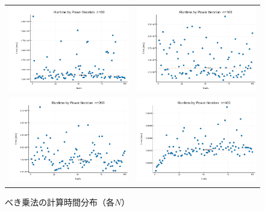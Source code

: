 \documentclass[a4paper,11pt]{ltjsarticle}
\begin{document}
\begin{figure}[H]
  \centering
  \begin{tabular}{cc}
    \includegraphics[width=72mm]{graphs/exp3_n50_time.png} &
    \includegraphics[width=72mm]{graphs/exp3_n100_time.png} \\
    \includegraphics[width=72mm]{graphs/exp3_n200_time.png} &
    \includegraphics[width=72mm]{graphs/exp3_n400_time.png} \\
  \end{tabular}
  \caption{べき乗法の計算時間分布（各$N$）}
  \label{fig:exp3_time}
\end{figure}
\end{document}
